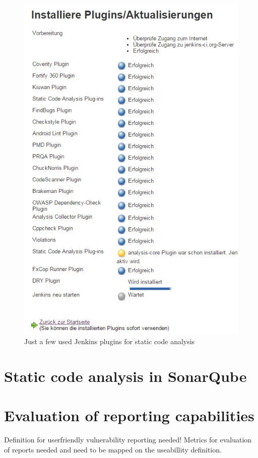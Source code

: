 \documentclass[conference]{IEEEtran}
\begin{document}
\begin{figure}[!t]
	\centering
	\includegraphics[width=1\linewidth]{img/jenkins-code-analysis-plugins.png}
	\caption{Just a few used Jenkins plugins for static code analysis}
	\label{fig:jenkins-plugins}
\end{figure}


\section{Static code analysis in SonarQube}
\label{sec:static_code_analysis_sonarqube}



\section{Evaluation of reporting capabilities}
\label{sec:evaluation}
Definition for userfriendly vulnerability reporting needed!
Metrics for evaluation of reports needed and need to be mapped on the useabillity definition. 
\end{document}
